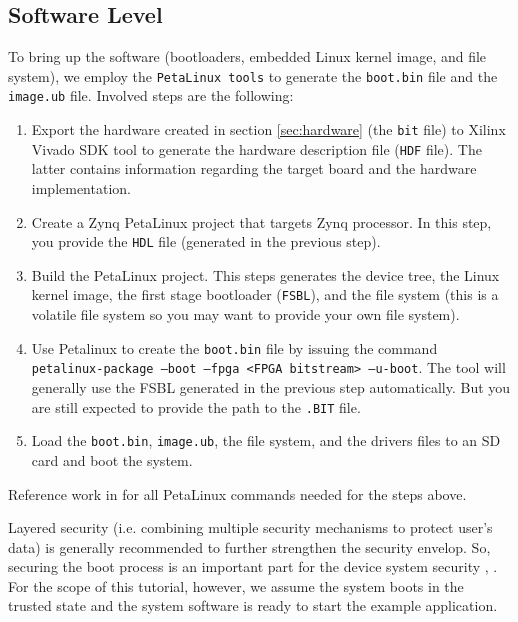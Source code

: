 \documentclass[sigconf]{acmart}
\theoremstyle{plain}
\theoremstyle{remark}
\begin{document}
\subsection{Software Level}

To bring up the software (bootloaders, embedded Linux kernel image, and file system), we employ the \texttt{PetaLinux tools} to generate the \texttt{boot.bin} file and the \texttt{image.ub} file. Involved steps are the following:

\begin{enumerate}
\item Export the hardware created in section \ref{sec:hardware} (the \texttt{bit} file) to Xilinx Vivado SDK tool to generate the hardware description file (\texttt{HDF} file). The latter contains information regarding the target board and the hardware implementation.

\item Create a Zynq PetaLinux project that targets Zynq processor. In this step, you provide the \texttt{HDL} file (generated in the previous step).

\item Build the PetaLinux project. This steps generates the device tree, the Linux kernel image, the first stage bootloader (\texttt{FSBL}), and the file system (this is a volatile file system so you may want to provide your own file system).

\item Use Petalinux to create the \texttt{boot.bin} file by issuing the command \texttt{petalinux-package --boot --fpga <FPGA bitstream> --u-boot}. The tool will generally use the FSBL generated in the previous step automatically. But you are still expected to provide the path to the \texttt{.BIT} file.

\item Load the \texttt{boot.bin}, \texttt{image.ub}, the file system, and the drivers files to an SD card and boot the system.

\end{enumerate}

Reference work in \cite{petalinux} for all PetaLinux commands needed for the steps above.

Layered security (i.e. combining multiple security mechanisms to protect user's data) is generally recommended to further strengthen the security envelop. So, securing the boot process is an important part for the device system security \cite{referencem}, \cite{secpoliciies}. For the scope of this tutorial, however, we assume the system boots in the trusted state and the system software is ready to start the example application.
\end{document}
